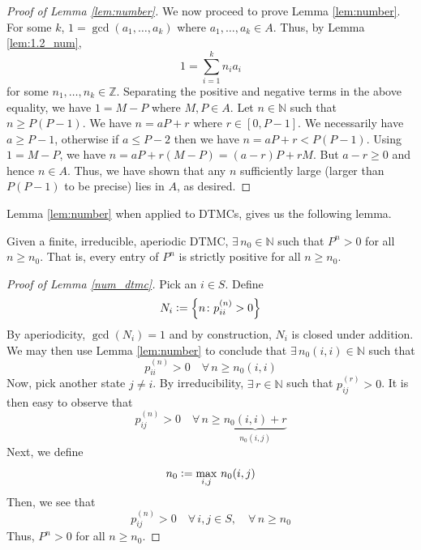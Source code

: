\documentclass[12pt]{article}
\theoremstyle{definition}
\begin{document}
\begin{proof}[Proof of Lemma \ref{lem:number}]
    We now proceed to prove Lemma \ref{lem:number}. For some $k$, $1 = \gcd\left( a_1, \ldots, a_k \right)$ where $a_1, \ldots, a_k \in A$. Thus, by Lemma \ref{lem:1.2_num}, 
    \[
        1 = \sum_{i=1}^k n_i a_i
    \]
    for some $n_1, \ldots, n_k \in \mathbb{Z}$. Separating the positive and negative terms in the above equality, we have $1 = M - P$ where $M, P \in A$. Let $n \in \mathbb{N}$ such that $n \geq P(P-1)$. We have $n = aP + r$ where $r \in [0, P-1]$. We necessarily have $a \geq P-1$, otherwise if $a \leq P-2$ then we have $n = aP+r < P(P-1)$. Using $1 = M-P$, we have $n = aP + r(M-P) = (a-r)P + rM$. But $a-r \geq 0$ and hence $n \in A$. Thus, we have shown that any $n$ sufficiently large (larger than $P(P-1)$ to be precise) lies in $A$, as desired.
\end{proof}

Lemma \ref{lem:number} when applied to DTMCs, gives us the following lemma. 

\begin{lem} \label{num_dtmc}
    Given a finite, irreducible, aperiodic DTMC, $\exists \, n_0 \in \mathbb{N}$ such that $P^n > 0$ for all $n \geq n_0$. That is, every entry of $P^n$ is strictly positive for all $n \geq n_0$.
\end{lem}

\begin{proof}[Proof of Lemma \ref{num_dtmc}]
    Pick an $i \in S$. Define
    \[
        N_i \vcentcolon= \left\{ n \colon p_{ii}^{(n)} > 0 \right\}
    \]
    By aperiodicity, $\gcd(N_i) = 1$ and by construction, $N_i$ is closed under addition. We may then use Lemma \ref{lem:number} to conclude that $\exists \, n_0(i,i) \in \mathbb{N}$ such that
    \[  
        p_{ii}^{(n)} > 0 \quad \forall \, n \geq n_0(i,i)
    \]
    Now, pick another state $j \neq i$. By irreducibility, $\exists \, r \in \mathbb{N}$ such that $p_{ij}^{(r)} > 0$. It is then easy to observe that
    \[
        p_{ij}^{(n)} > 0 \quad \forall \, n \geq \underbrace{n_0(i,i) + r}_{n_0(i,j)}
    \]
    Next, we define
    \[
        n_0 \vcentcolon= \max_{i,j} \, n_0(i,j)
    \]
    Then, we see that
    \[
        p_{ij}^{(n)} > 0 \quad \forall \, i, j \in S, \quad \forall \, n \geq n_0
    \]
    Thus, $P^n > 0$ for all $n \geq n_0$.
\end{proof}
\end{document}
